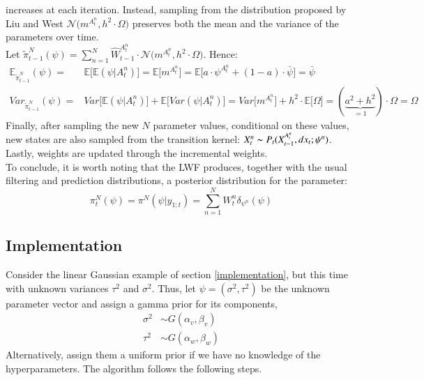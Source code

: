 \documentclass[
]{book}
\theoremstyle{break}
\theoremstyle{nonumberplain}
\begin{document}
increases at each iteration. Instead, sampling from the distribution
proposed by Liu and West
\(\mathcal N\big(m^{A_t^n},h^2\cdot \Omega\big)\) preserves both the
mean and the variance of the parameters over time.\\
Let
\(\tilde \pi_{t-1}^N(\psi)=\sum_{n=1}^N \hat W_{t-1}^{A_t^{n}}\cdot \mathcal N\big(m^{A_t^n},h^2\cdot \Omega\big)\).
Hence: \begin{equation*}
    \begin{split}
        \mathbb E_{\tilde \pi_{t-1}^N} ( \psi)=& \mathbb E\big[\mathbb E( \psi|A_t^{n})\big]=\mathbb E\big[m^{A_t^n}\big]=\mathbb E\big[a\cdot \psi^{A_t^n}+(1-a)\cdot \bar \psi\big]=\bar \psi\\
        Var_{\tilde \pi_{t-1}^N} ( \psi)=&Var\big[\mathbb E( \psi|A_t^{n})\big]+\mathbb E\big[Var( \psi|A_t^{n})\big]=Var\big[m^{A_t^n}\big]+h^2\cdot\mathbb E\big[\Omega\big]=(\underbrace{a^2+h^2}_{=1})\cdot \Omega =\Omega
    \end{split}
\end{equation*} Finally, after sampling the new \(N\) parameter values,
conditional on these values, new states are also sampled from the
transition kernel: \(X_t^n\thicksim P_t(X_{t-1}^{A_t^n},dx_t; \psi^n)\).
Lastly, weights are updated through the incremental weights.~\\
To conclude, it is worth noting that the LWF produces, together with the
usual filtering and prediction distributions, a posterior distribution
for the parameter: \begin{equation}
    \pi^N_{t}(\psi)=\pi^N(\psi|y_{1:t})=\sum_{n=1}^NW_{t}^n\delta_{\psi^n}(\psi)
\end{equation}

\subsection{Implementation}

\hfill\break
Consider the linear Gaussian example of section \ref{implementation},
but this time with unknown variances \(\tau^{2}\) and \(\sigma^{2}\).
Thus, let \(\psi=(\sigma^{2},\tau^{2})\) be the unknown parameter vector
and assign a gamma prior for its components, \begin{align*}
\sigma^{2}  & \sim G(\alpha_{v},\beta_{v}) \\
\tau^{2}  & \sim G(\alpha_{w},\beta_{w})
\end{align*} Alternatively, assign them a uniform prior if we have no
knowledge of the hyperparameters. The algorithm follows the following
steps.
\end{document}
